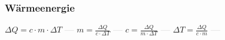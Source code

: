 \subsubsection{Wärmeenergie} 
\begin{minipage}{0.45\textwidth} 
\end{minipage} 
\begin{minipage}{0.45\textwidth} 
 
\end{minipage} 
$ \Delta Q = c\cdot m\cdot \Delta T $ \textcolor{lightgray}{\textbf{---}} 
$ m = \frac{ \Delta Q}{c\cdot \Delta T} $ \textcolor{lightgray}{\textbf{---}} 
$ c = \frac{ \Delta Q}{m\cdot \Delta T} $ \textcolor{lightgray}{\textbf{---}} 
$ \Delta T = \frac{\Delta Q}{c\cdot m} $ \textcolor{lightgray}{\textbf{---}} 

